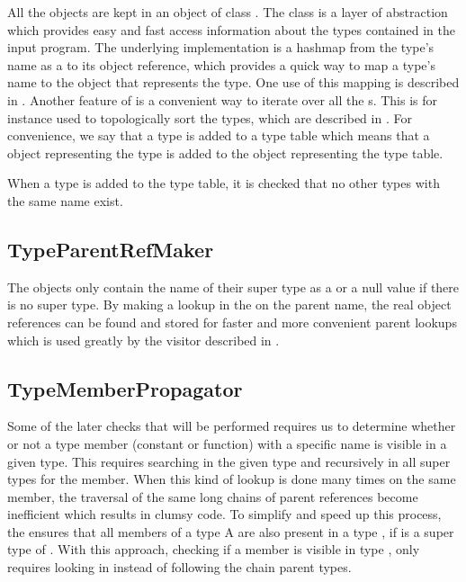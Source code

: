 All the  objects are kept in an object of class
. The  class is a layer of abstraction
which provides easy and fast access information about the types contained in the
input program. The underlying implementation is a hashmap from the type's name
as a  to its object reference, which provides a quick way to map a type's name
to the  object that represents the type. One use of this mapping is 
described in . Another feature of  is a 
convenient way to iterate over all the s. This is for instance used
to topologically sort the types, which are described in .
For convenience, we say that a type is added to a type table which means that a
 object representing the type is added to the
 object representing the type table.

When a type is added to the type table, it is checked that no other types with
the same name exist.

\subsection{TypeParentRefMaker}
\label{sec:TypeParentRefMaker}
The  objects only contain the name of their super type
as a  or a null value if there is no super type. By making a
lookup in the  on the parent name, the real object
references can be found and stored for faster and more convenient parent lookups
which is used greatly by the visitor described in
.

\subsection{TypeMemberPropagator}
\label{sec:TypeMemberPropagator}
Some of the later checks that will be performed requires us to determine whether
or not a type member (constant or function) with a specific name is visible in a
given type. This requires searching in the given type and recursively in all
super types for the member. When this kind of lookup is done many times on the
same member, the traversal of the same long chains of parent references become
inefficient which results in clumsy code. To simplify and speed up this process,
the  ensures that all members of a type A are
also present in a type , if  is a super type of . With
this approach, checking if a member is visible in type , only requires
looking in  instead of following the chain parent types.

